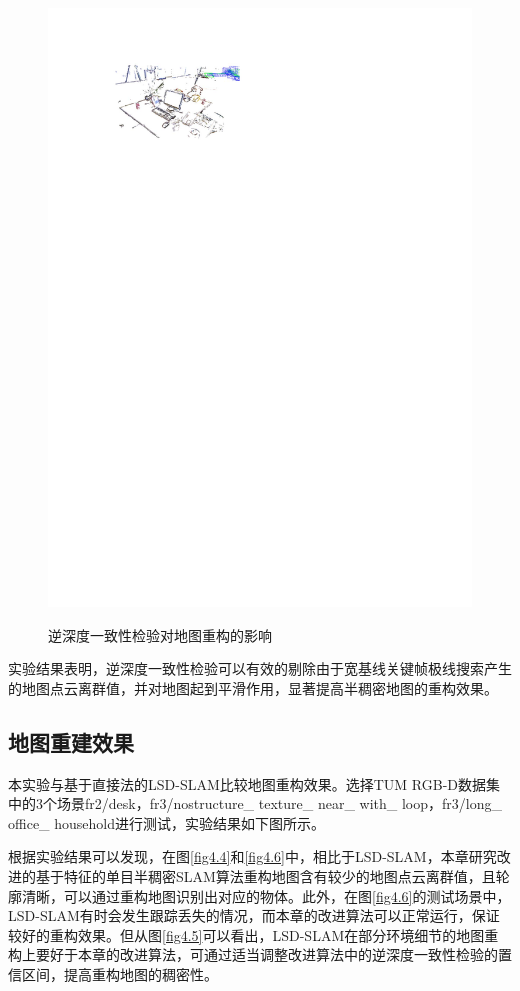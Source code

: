 \begin{figure}[h]
{          \includegraphics[scale=1]{figures/Fig4-3_b.pdf}
          }
     \caption{逆深度一致性检验对地图重构的影响}
\label{fig4.3}
\end{figure}

实验结果表明，逆深度一致性检验可以有效的剔除由于宽基线关键帧极线搜索产生的地图点云离群值，并对地图起到平滑作用，显著提高半稠密地图的重构效果。

\subsection{地图重建效果}
本实验与基于直接法的LSD-SLAM比较地图重构效果。选择TUM RGB-D数据集中的3个场景fr2/desk，fr3/nostructure\_ texture\_ near\_ with\_ loop，fr3/long\_ office\_ household进行测试，实验结果如下图所示。

根据实验结果可以发现，在图\ref{fig4.4}和\ref{fig4.6}中，相比于LSD-SLAM，本章研究改进的基于特征的单目半稠密SLAM算法重构地图含有较少的地图点云离群值，且轮廓清晰，可以通过重构地图识别出对应的物体。此外，在图\ref{fig4.6}的测试场景中，LSD-SLAM有时会发生跟踪丢失的情况，而本章的改进算法可以正常运行，保证较好的重构效果。但从图\ref{fig4.5}可以看出，LSD-SLAM在部分环境细节的地图重构上要好于本章的改进算法，可通过适当调整改进算法中的逆深度一致性检验的置信区间，提高重构地图的稠密性。



